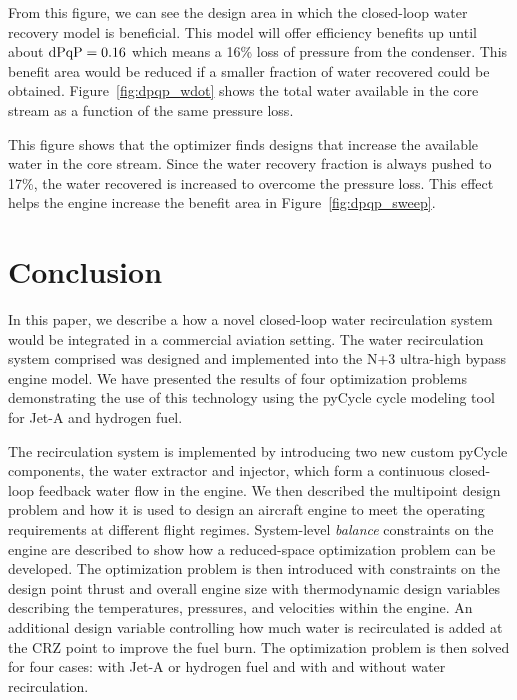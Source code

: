 \documentclass[conf]{new-aiaa}
\begin{document}
From this figure, we can see the design area in which the closed-loop water recovery model is beneficial.
This model will offer efficiency benefits up until about $\rm{dPqP} = 0.16$ which means a 16\% loss of pressure from the condenser.
This benefit area would be reduced if a smaller fraction of water recovered could be obtained.
Figure~\ref{fig:dpqp_wdot} shows the total water available in the core stream as a function of the same pressure loss.

This figure shows that the optimizer finds designs that increase the available water in the core stream.
Since the water recovery fraction is always pushed to 17\%, the water recovered is increased to overcome the pressure loss.
This effect helps the engine increase the benefit area in Figure~\ref{fig:dpqp_sweep}.


\section{Conclusion}
\label{sec:conc}
In this paper, we describe a how a novel closed-loop water recirculation system would be integrated in a commercial aviation setting.
The water recirculation system comprised was designed and implemented into the N+3 ultra-high bypass engine model.
We have presented the results of four optimization problems demonstrating the use of this technology using the pyCycle cycle modeling tool for Jet-A and hydrogen fuel.

The recirculation system is implemented by introducing two new custom pyCycle components, the water extractor and injector, which form a continuous closed-loop feedback water flow in the engine.
We then described the multipoint design problem and how it is used to design an aircraft engine to meet the operating requirements at different flight regimes.
System-level \emph{balance} constraints on the engine are described to show how a reduced-space optimization problem can be developed.
The optimization problem is then introduced with constraints on the design point thrust and overall engine size with thermodynamic design variables describing the temperatures, pressures, and velocities within the engine.
An additional design variable controlling how much water is recirculated is added at the CRZ point to improve the fuel burn.
The optimization problem is then solved for four cases: with Jet-A or hydrogen fuel and with and without water recirculation.
\end{document}
